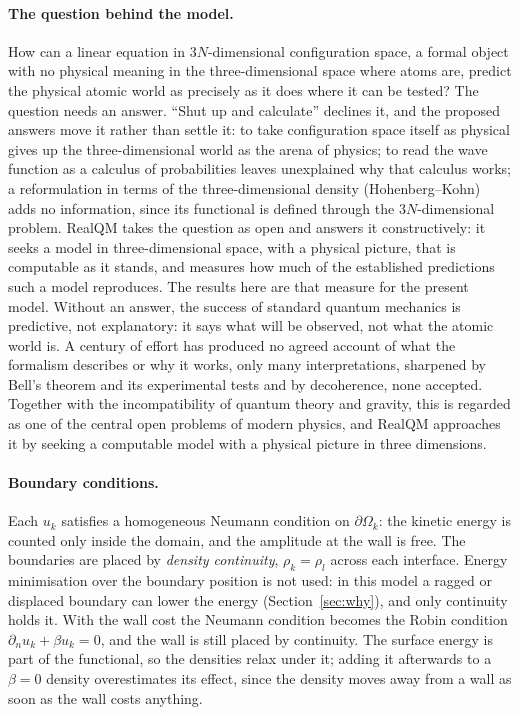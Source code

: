 \documentclass[11pt]{article}
\begin{document}
\paragraph{The question behind the model.} How can a linear equation in $3N$-dimensional configuration space,
a formal object with no physical meaning in the three-dimensional space where atoms are, predict the physical
atomic world as precisely as it does where it can be tested? The question needs an answer. ``Shut up and
calculate'' declines it, and the proposed answers move it rather than settle it: to take configuration space
itself as physical gives up the three-dimensional world as the arena of physics; to read the wave function as
a calculus of probabilities leaves unexplained why that calculus works; a reformulation in terms of the
three-dimensional density (Hohenberg--Kohn) adds no information, since its functional is defined through the
$3N$-dimensional problem. RealQM takes the question as open and answers it constructively: it seeks a model in
three-dimensional space, with a physical picture, that is computable as it stands, and measures how much of the
established predictions such a model reproduces. The results here are that measure for the present model.
Without an answer, the success of standard quantum mechanics is predictive, not explanatory: it says what will
be observed, not what the atomic world is. A century of effort has produced no agreed account of what the
formalism describes or why it works, only many interpretations, sharpened by Bell's theorem and its experimental
tests and by decoherence, none accepted. Together with the incompatibility of quantum theory and gravity, this is
regarded as one of the central open problems of modern physics, and RealQM approaches it by seeking a computable
model with a physical picture in three dimensions.

\paragraph{Boundary conditions.} Each $u_k$ satisfies a homogeneous Neumann condition on
$\partial\Omega_k$: the kinetic energy is counted only inside the domain, and the amplitude at the
wall is free. The boundaries are placed by \emph{density continuity}, $\rho_k = \rho_l$ across each
interface. Energy minimisation over the boundary position is not used: in this model a ragged or
displaced boundary can lower the energy (Section~\ref{sec:why}), and only continuity holds it. With the wall
cost the Neumann condition becomes the Robin condition $\partial_n u_k + \beta u_k = 0$, and the wall is still
placed by continuity. The surface energy is part of the functional, so the densities relax under it; adding it
afterwards to a $\beta = 0$ density overestimates its effect, since the density moves away from a wall as soon
as the wall costs anything.
\end{document}
